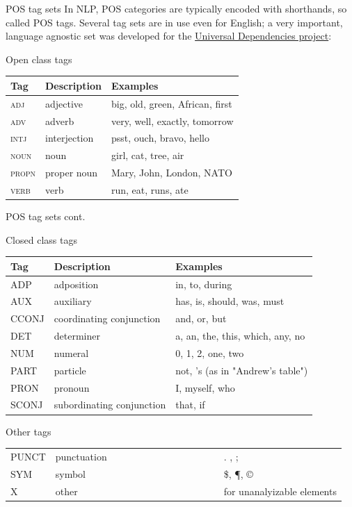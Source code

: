 \documentclass[style=upen, size=14pt]{powerdot}
\begin{document}
\begin{slide}[toc=]{POS tag sets}
  In NLP, POS categories are typically encoded with shorthands, so called POS
  tags. Several tag sets are in use even for English; a very important, language
  agnostic set was developed for the
  \href{https://universaldependencies.org/}{Universal Dependencies
    project}:\smallskip

  \begin{center}
    \small
    Open class tags\smallskip
    
    \begin{tabular}{lll}
      \hline
      Tag & Description & Examples\\
      \hline
      \textsc{adj} & adjective & big, old, green, African, first\\
      \textsc{adv} & adverb & very, well, exactly, tomorrow\\
      \textsc{intj} & interjection & psst, ouch, bravo, hello\\
      \textsc{noun} & noun & girl, cat, tree, air\\
      \textsc{propn} & proper noun & Mary, John, London, NATO\\
      \textsc{verb} & verb & run, eat, runs, ate\\
    \end{tabular}
  \end{center}
\end{slide}

\begin{slide}[toc=]{POS tag sets cont.}
  \begin{center}
    \small
    {Closed class tags}\smallskip
    
    \begin{tabular}{lll}
      \hline
      Tag & Description & Examples\\
      \hline
      ADP & adposition & in, to, during\\
      AUX & auxiliary & has, is, should, was, must\\
      CCONJ & coordinating conjunction & and, or, but\\
      DET & determiner & a, an, the, this, which, any, no\\
      NUM & numeral & 0, 1, 2, one, two\\
      PART & particle & not, 's (as in "Andrew's table")\\
      PRON & pronoun & I, myself, who\\
      SCONJ & subordinating conjunction & that, if\\
    \end{tabular}
    \smallskip
    
    \small
    {Other tags}\smallskip
    
    \begin{tabular}{lll}
      PUNCT & punctuation~~~~~~~~~~~~~~~~~~~~~~ & .  ,  ;\\
      SYM & symbol & \$,  \P, \copyright \\
      X & other & for unanalyizable elements\\
    \end{tabular}
  \end{center}
\end{slide}
\end{document}
